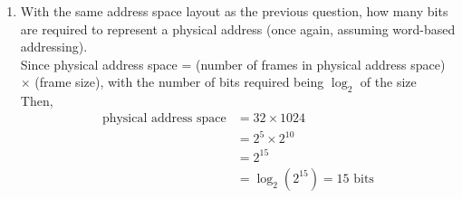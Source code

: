 \documentclass[paper=usletter, fontsize=12pt]{article}
\begin{document}
\begin{enumerate}
        \item With the same address space layout as the previous question, how
        many bits are required to represent a physical address (once again,
        assuming word-based addressing).\\
        Since physical address space = (number of frames in physical address
        space) $\times$ (frame size), with the number of bits required being
        $\log_2$ of the size\\
        Then,
        \begin{align*}
            \text{physical address space} & = 32 \times 1024\\
            & = 2^{5} \times 2^{10}\\
            & = 2^{15}\\
            & = \log_2(2^{15}) = 15 \text{ bits}
        \end{align*}

    \end{enumerate}
\end{document}
